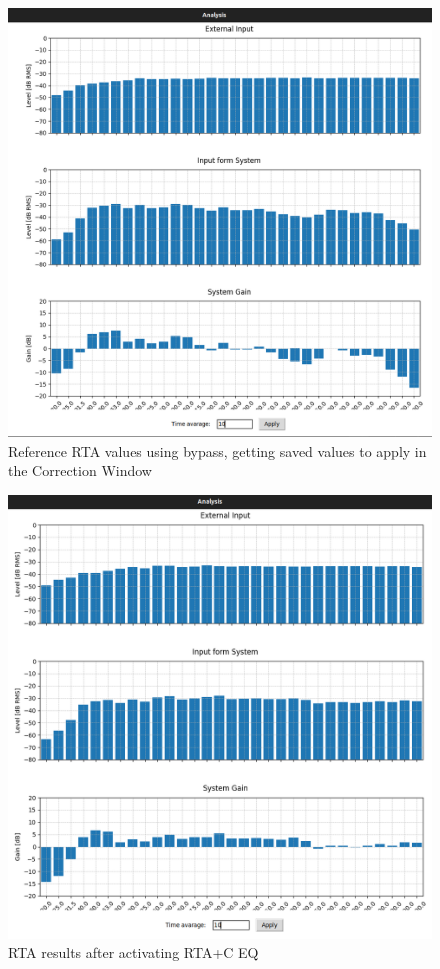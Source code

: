 \begin{figure}[H]
	\centering
	\includegraphics[width=0.8
	\linewidth]{Figures/Coro_RTA_Saved.png}
	\caption[Reference RTA values]{Reference RTA values using bypass, getting saved values to apply in the Correction Window}
	\label{fig:Coro_RTA_saved}
\end{figure}

\begin{figure}[H]
	\centering
	\includegraphics[width=0.8
	\linewidth]{Figures/Coro_RTA+EQ_ON.png}
	\caption{RTA results after activating RTA+C EQ}
	\label{fig:Coro_RTA_RTA+C}
\end{figure}


